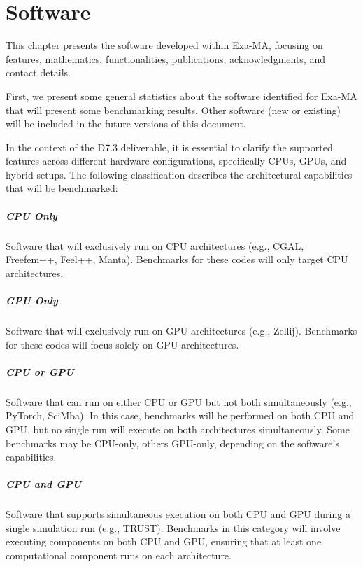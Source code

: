 \clearpage
\chapter{Software}
\label{sec:software}

This chapter presents the software developed within Exa-MA, focusing on features, mathematics, functionalities, publications, acknowledgments, and contact details.

First, we present some general statistics about the software identified for Exa-MA that will present some benchmarking results. 
Other software (new or existing) will be included in the future versions of this document.

In the context of the D7.3 deliverable, it is essential to clarify the supported features across different hardware configurations, specifically CPUs, GPUs, and hybrid setups. 
The following classification describes the architectural capabilities that will be benchmarked:

\paragraph{CPU Only}
Software that will exclusively run on CPU architectures (e.g., CGAL, Freefem++, Feel++, Manta). Benchmarks for these codes will only target CPU architectures.

\paragraph{GPU Only}
Software that will exclusively run on GPU architectures (e.g., Zellij). Benchmarks for these codes will focus solely on GPU architectures.

\paragraph{CPU or GPU}
Software that can run on either CPU or GPU but not both simultaneously (e.g., PyTorch, SciMba). In this case, benchmarks will be performed on both CPU and GPU, but no single run will execute on both architectures simultaneously. Some benchmarks may be CPU-only, others GPU-only, depending on the software's capabilities.

\paragraph{CPU and GPU}
Software that supports simultaneous execution on both CPU and GPU during a single simulation run (e.g., TRUST). Benchmarks in this category will involve executing components on both CPU and GPU, ensuring that at least one computational component runs on each architecture.

